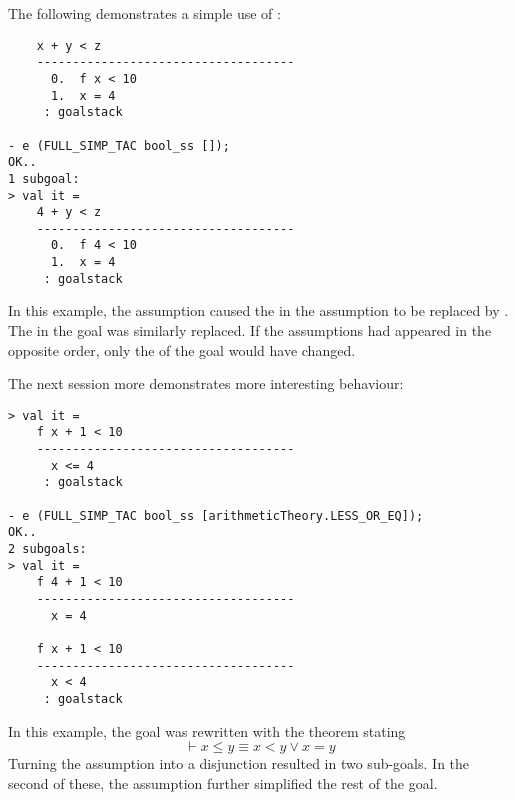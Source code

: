 The following demonstrates a simple use of :
\begin{session}
\begin{verbatim}
    x + y < z
    ------------------------------------
      0.  f x < 10
      1.  x = 4
     : goalstack

- e (FULL_SIMP_TAC bool_ss []);
OK..
1 subgoal:
> val it =
    4 + y < z
    ------------------------------------
      0.  f 4 < 10
      1.  x = 4
     : goalstack
\end{verbatim}
\end{session}
In this example, the assumption  caused the 
in the assumption  to be replaced by .  The
 in the goal was similarly replaced.  If the assumptions had
appeared in the opposite order, only the  of the goal would
have changed.

The next session more demonstrates more interesting behaviour:
\begin{session}
\begin{verbatim}
> val it =
    f x + 1 < 10
    ------------------------------------
      x <= 4
     : goalstack

- e (FULL_SIMP_TAC bool_ss [arithmeticTheory.LESS_OR_EQ]);
OK..
2 subgoals:
> val it =
    f 4 + 1 < 10
    ------------------------------------
      x = 4

    f x + 1 < 10
    ------------------------------------
      x < 4
     : goalstack
\end{verbatim}
\end{session}
In this example, the goal was rewritten with the theorem stating \[
\vdash x \leq y \equiv x < y \lor x = y
\]
Turning the assumption into a disjunction resulted in two sub-goals.
In the second of these, the assumption  further
simplified the rest of the goal.

\subsubsection{}

